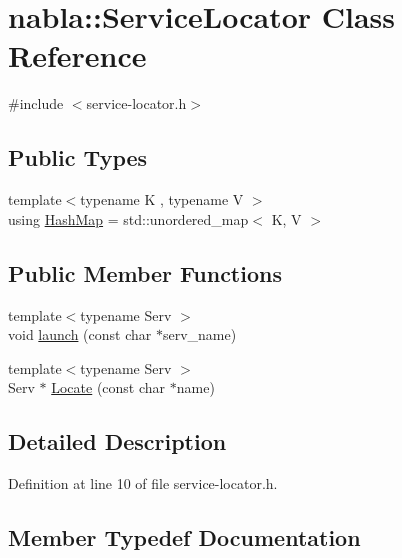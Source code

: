\hypertarget{classnabla_1_1_service_locator}{}\section{nabla\+::Service\+Locator Class Reference}
\label{classnabla_1_1_service_locator}


{\ttfamily \#include $<$service-\/locator.\+h$>$}

\subsection*{Public Types}
\begin{DoxyCompactItemize}
\item 
{\footnotesize template$<$typename K , typename V $>$ }\\using \mbox{\hyperlink{classnabla_1_1_service_locator_a42756b69c11c011fe507276d9a506d1b}{Hash\+Map}} = std\+::unordered\+\_\+map$<$ K, V $>$
\end{DoxyCompactItemize}
\subsection*{Public Member Functions}
\begin{DoxyCompactItemize}
\item 
{\footnotesize template$<$typename Serv $>$ }\\void \mbox{\hyperlink{classnabla_1_1_service_locator_afe958b541a63a56d7d32e563332b31bb}{launch}} (const char $\ast$serv\+\_\+name)
\item 
{\footnotesize template$<$typename Serv $>$ }\\Serv $\ast$ \mbox{\hyperlink{classnabla_1_1_service_locator_ad9d11cf92529d1f28388b20cc820e92c}{Locate}} (const char $\ast$name)
\end{DoxyCompactItemize}


\subsection{Detailed Description}


Definition at line 10 of file service-\/locator.\+h.



\subsection{Member Typedef Documentation}
\mbox{\label{classnabla_1_1_service_locator_a42756b69c11c011fe507276d9a506d1b}} 
